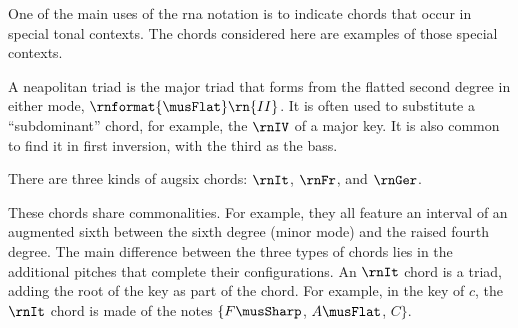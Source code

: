 
One of the main uses of the \gls{rna} notation is to
indicate chords that occur in special tonal contexts. The
chords considered here are examples of those special
contexts.


A \gls{neapolitan} triad is the major triad that forms from
the flatted second degree in either mode,
$\rnformat{\musFlat}\rn{II}$. It is often used to substitute
a ``subdominant'' chord, for example, the $\rnIV$ of a major
key. It is also common to find it in first inversion, with
the third as the bass.


There are three kinds of \gls{augsix} chords: $\rnIt$,
$\rnFr$, and $\rnGer$.

These chords share commonalities. For example, they all
feature an interval of an augmented sixth between the sixth
degree (minor mode) and the raised fourth degree. The main
difference between the three types of chords lies in the
additional pitches that complete their configurations. An
$\rnIt$ chord is a triad, adding the root of the key as part
of the chord. For example, in the key of $c$, the $\rnIt$
chord is made of the notes $\{F\musSharp$, $A\musFlat$, $C\}$.
